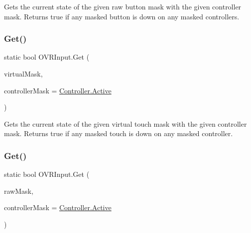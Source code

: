 Gets the current state of the given raw button mask with the given controller mask. Returns true if any masked button is down on any masked controllers. 

\mbox{\label{class_o_v_r_input_a166b60cfe8c0d26773c5bbe03194bbaf}} 
\subsubsection{\texorpdfstring{Get()}{Get()}\hspace{0.1cm}{\footnotesize\ttfamily [3/10]}}
{\footnotesize\ttfamily static bool O\+V\+R\+Input.\+Get (\begin{DoxyParamCaption}\item[{\mbox{\hyperlink{class_o_v_r_input_a4e1f1eb856223383aefc1965dd2db39a}{Touch}}}]{virtual\+Mask,  }\item[{\mbox{\hyperlink{class_o_v_r_input_a5c86f9052a9cbb0b73779ff5704d60a8}{Controller}}}]{controller\+Mask = {\ttfamily \mbox{\hyperlink{class_o_v_r_input_a5c86f9052a9cbb0b73779ff5704d60a8a4d3d769b812b6faa6b76e1a8abaece2d}{Controller.\+Active}}} }\end{DoxyParamCaption})\hspace{0.3cm}{\ttfamily [static]}}



Gets the current state of the given virtual touch mask with the given controller mask. Returns true if any masked touch is down on any masked controller. 

\mbox{\label{class_o_v_r_input_a406a3baba0bd66abfe0d158a711f53dc}} 
\subsubsection{\texorpdfstring{Get()}{Get()}\hspace{0.1cm}{\footnotesize\ttfamily [4/10]}}
{\footnotesize\ttfamily static bool O\+V\+R\+Input.\+Get (\begin{DoxyParamCaption}\item[{\mbox{\hyperlink{class_o_v_r_input_a6e130faa2035c5b20853c1177d909cc6}{Raw\+Touch}}}]{raw\+Mask,  }\item[{\mbox{\hyperlink{class_o_v_r_input_a5c86f9052a9cbb0b73779ff5704d60a8}{Controller}}}]{controller\+Mask = {\ttfamily \mbox{\hyperlink{class_o_v_r_input_a5c86f9052a9cbb0b73779ff5704d60a8a4d3d769b812b6faa6b76e1a8abaece2d}{Controller.\+Active}}} }\end{DoxyParamCaption})\hspace{0.3cm}{\ttfamily [static]}}



